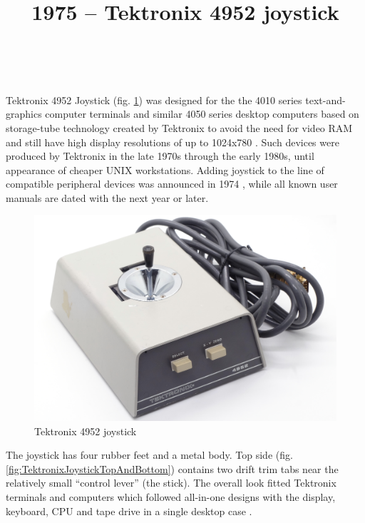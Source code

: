 \documentclass[11pt, a4paper]{article}
\begin{document}
\title{1975 -- Tektronix 4952 joystick}
\date{}
\author{~}
\maketitle
{}

Tektronix 4952 Joystick (fig. \ref{fig:TektronixJoystickPic}) was designed for the the 4010 series text-and-graphics computer terminals and similar 4050 series desktop computers based on storage-tube technology created by Tektronix to avoid the need for video RAM and still have high display resolutions of up to 1024x780 \cite{wiki}. Such devices were produced by Tektronix in the late 1970s through the early 1980s, until appearance of cheaper UNIX workstations. Adding joystick to the line of compatible peripheral devices was announced in 1974 \cite{adv}, while all known user manuals are dated with the next year or later.

\begin{figure}[h]
   \centering
    \includegraphics[scale=0.5]{1975_Tektronix_4952_Joystick/pic_30.jpg}
    \caption{Tektronix 4952 joystick}
    \label{fig:TektronixJoystickPic}
\end{figure}

The joystick has four rubber feet and a metal body. Top side (fig. \ref{fig:TektronixJoystickTopAndBottom}) contains two drift trim tabs \cite{manual} near the relatively small ``control lever'' (the stick). The overall look fitted Tektronix terminals and computers which followed all-in-one designs with the display, keyboard, CPU and tape drive in a single desktop case \cite{wiki}.
\end{document}
